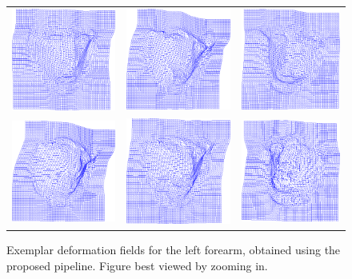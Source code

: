 \begin{figure}[t!]
        \centering
        \begin{tabular}{ccc}
        \includegraphics[trim=200 150 200 50,clip,width=.25\columnwidth]{resources/Fig_Flows/1}
        &
        \includegraphics[trim=200 150 200 50,clip,width=.25\columnwidth]{resources/Fig_Flows/2}
        &
        \includegraphics[trim=200 150 200 50,clip,width=.25\columnwidth]{resources/Fig_Flows/3}
        \\
        \includegraphics[trim=200 150 200 50,clip,width=.25\columnwidth]{resources/Fig_Flows/4}
        &
        \includegraphics[trim=200 150 200 50,clip,width=.25\columnwidth]{resources/Fig_Flows/5}
        &
        \includegraphics[trim=200 150 200 50,clip,width=.25\columnwidth]{resources/Fig_Flows/6}
        \end{tabular}
    \caption{Exemplar deformation fields for the left forearm, obtained using the proposed pipeline. Figure best viewed by zooming in.}
    \label{fig:deformationfield}
\end{figure}
